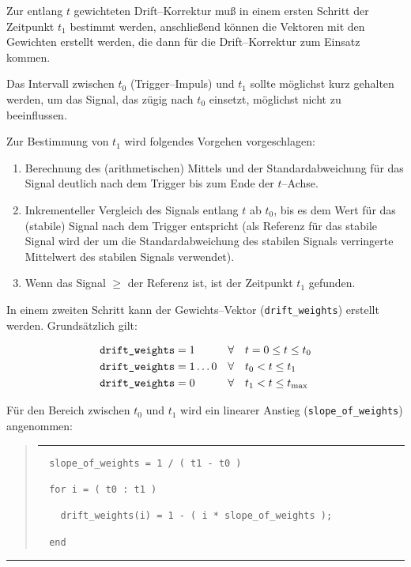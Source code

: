 \documentclass{article}
\newcommand{\var}[1]{\texttt{#1}}
\newenvironment{Quote}{\begin{quote}\small\vspace*{1em}\hrule\vspace*{1ex}
}{\end{quote}\hrule\vspace*{1em}}
\begin{document}
Zur entlang $t$ gewichteten Drift--Korrektur muß in einem ersten Schritt der 
Zeitpunkt $t_1$ bestimmt werden, anschließend können die Vektoren mit den 
Gewichten erstellt werden, die dann für die Drift--Korrektur zum Einsatz kommen.

Das Intervall zwischen $t_0$ (Trigger--Impuls) und $t_1$ sollte möglichst kurz 
gehalten werden, um das Signal, das zügig nach $t_0$ einsetzt, möglichst nicht 
zu beeinflussen.

Zur Bestimmung von $t_1$ wird folgendes Vorgehen vorgeschlagen:
\begin{enumerate}
  \item Berechnung des (arithmetischen) Mittels und der Standardabweichung für 
  das Signal deutlich nach dem Trigger bis zum Ende der $t$--Achse.
  \item Inkrementeller Vergleich des Signals entlang $t$ ab $t_0$, bis es dem 
  Wert für das (stabile) Signal nach dem Trigger entspricht (als Referenz für 
  das stabile Signal wird der um die Standardabweichung des stabilen Signals 
  verringerte Mittelwert des stabilen Signals verwendet).
  \item Wenn das Signal $\geq$ der Referenz ist, ist der Zeitpunkt $t_1$ 
  gefunden.
\end{enumerate}

In einem zweiten Schritt kann der Gewichts--Vektor (\var{drift\_weights}) 
erstellt werden. Grundsätzlich gilt:

\begin{align*}
  \text{\var{drift\_weights}} &= 1 & \forall & \quad t=0 \leq t \leq t_0\\ 
  \text{\var{drift\_weights}} &= 1\dots 0 & \forall & \quad t_0 < t \leq t_1\\
  \text{\var{drift\_weights}} &= 0 & \forall & \quad t_1 < t \leq t_\text{max}
\end{align*}

Für den Bereich zwischen $t_0$ und $t_1$ wird ein linearer Anstieg 
(\var{slope\_of\_weights}) angenommen:

\begin{Quote}
\begin{verbatim}
  slope_of_weights = 1 / ( t1 - t0 )
  
  for i = ( t0 : t1 )
  
    drift_weights(i) = 1 - ( i * slope_of_weights );
  
  end
\end{verbatim}
\end{Quote}
\end{document}
